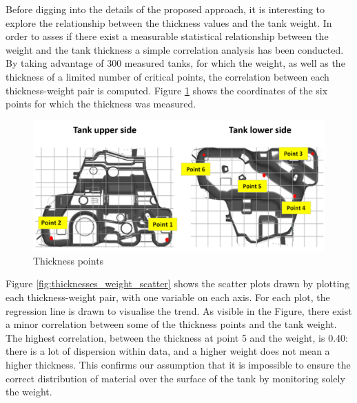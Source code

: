Before digging into the details of the proposed approach, it is interesting to explore the relationship between the thickness values and the tank weight. In order to asses if there exist a measurable statistical relationship between the weight and the tank thickness a simple correlation analysis has been conducted. By taking advantage of 300 measured tanks, for which the weight, as well as the thickness of a limited number of critical points, the correlation between each thickness-weight pair is computed. Figure \ref{fig:thickness_points} shows the coordinates of the six points for which the thickness was measured. 
%
\begin{figure}
\centering
\includegraphics[scale=0.55]{images/chapter_4/Thickness_points.png}
\caption{Thickness points}
\label{fig:thickness_points}
\end{figure}
%
Figure \ref{fig:thicknesses_weight_scatter} shows the scatter plots drawn by plotting each thickness-weight pair, with one variable on each axis. For each plot, the regression line is drawn to visualise the trend. As visible in the Figure, there exist a minor correlation between some of the thickness points and the tank weight. The highest correlation, between the thickness at point 5 and the weight, is 0.40: there is a lot of dispersion within data, and a higher weight does not mean a higher thickness. This confirms our assumption that it is impossible to ensure the correct distribution of material over the surface of the tank by monitoring solely the weight. 
%
